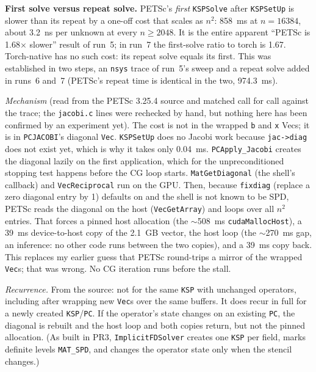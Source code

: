 \documentclass[11pt]{article}
\begin{document}
\textbf{First solve versus repeat solve.} PETSc's \emph{first}
\texttt{KSPSolve} after \texttt{KSPSetUp} is slower than its repeat by a
one-off cost that scales as $n^{2}$: 858~ms at $n=16384$, about 3.2~ns per
unknown at every $n\ge2048$. It is the entire apparent ``PETSc is
1.68$\times$ slower'' result of run~5; in run~7 the first-solve ratio to
torch is 1.67. Torch-native has no such cost: its repeat solve equals its
first. This was established in two steps, an \texttt{nsys} trace of run~5's
sweep and a repeat solve added in runs~6 and~7 (PETSc's repeat time is
identical in the two, 974.3~ms).

\textit{Mechanism} (read from the PETSc 3.25.4 source and matched call for
call against the trace; the \texttt{jacobi.c} lines were rechecked by hand,
but nothing here has been confirmed by an experiment yet). The cost is not in
the wrapped \texttt{b} and \texttt{x} Vecs; it is in \texttt{PCJACOBI}'s
diagonal \texttt{Vec}. \texttt{KSPSetUp} does no Jacobi work because
\texttt{jac->diag} does not exist yet, which is why it takes only 0.04~ms.
\texttt{PCApply\_Jacobi} creates the diagonal lazily on the first
application, which for the unpreconditioned stopping test happens before the
CG loop starts. \texttt{MatGetDiagonal} (the shell's callback) and
\texttt{VecReciprocal} run on the GPU. Then, because \texttt{fixdiag}
(replace a zero diagonal entry by 1) defaults on and the shell is not known
to be SPD, PETSc reads the diagonal on the host (\texttt{VecGetArray}) and
loops over all $n^{2}$ entries. That forces a pinned host allocation (the
$\sim$508~ms \texttt{cudaMallocHost}), a 39~ms device-to-host copy of the
2.1~GB vector, the host loop (the $\sim$270~ms gap, an inference: no other
code runs between the two copies), and a 39~ms copy back. This replaces my
earlier guess that PETSc round-trips a mirror of the wrapped \texttt{Vec}s;
that was wrong. No CG iteration runs before the stall.

\textit{Recurrence.} From the source: not for the same \texttt{KSP} with
unchanged operators, including after wrapping new \texttt{Vec}s over the
same buffers. It does recur in full for a newly created \texttt{KSP}/\texttt{PC}. If
the operator's state changes on an existing \texttt{PC}, the diagonal is
rebuilt and the host loop and both copies return, but not the pinned
allocation. (As built in PR3, \texttt{ImplicitFDSolver} creates one
\texttt{KSP} per field, marks definite levels \texttt{MAT\_SPD}, and changes
the operator state only when the stencil changes.)
\end{document}
